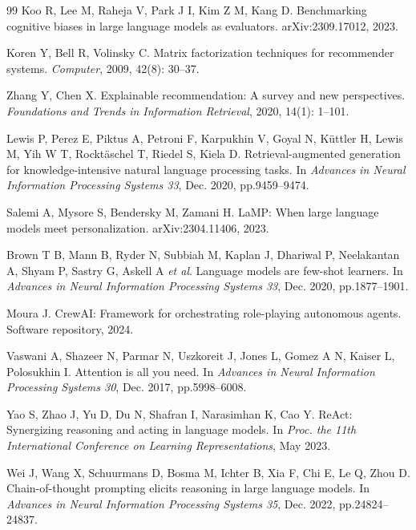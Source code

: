 \documentclass[9pt,twocolumn]{extarticle}
\begin{document}
\begin{thebibliography}{99}
Koo R, Lee M, Raheja V, Park J I, Kim Z M, Kang D. Benchmarking cognitive
biases in large language models as evaluators. arXiv:2309.17012, 2023.

Koren Y, Bell R, Volinsky C. Matrix factorization techniques for recommender
systems. \textit{Computer}, 2009, 42(8): 30--37.

Zhang Y, Chen X. Explainable recommendation: A survey and new perspectives.
\textit{Foundations and Trends in Information Retrieval}, 2020, 14(1): 1--101.

Lewis P, Perez E, Piktus A, Petroni F, Karpukhin V, Goyal N, K\"uttler H, Lewis
M, Yih W T, Rockt\"aschel T, Riedel S, Kiela D. Retrieval-augmented generation
for knowledge-intensive natural language processing tasks. In \textit{Advances
in Neural Information Processing Systems 33}, Dec. 2020, pp.9459--9474.

Salemi A, Mysore S, Bendersky M, Zamani H. LaMP: When large language models
meet personalization. arXiv:2304.11406, 2023.

Brown T B, Mann B, Ryder N, Subbiah M, Kaplan J, Dhariwal P, Neelakantan A,
Shyam P, Sastry G, Askell A \textit{et al}. Language models are few-shot
learners. In \textit{Advances in Neural Information Processing Systems 33},
Dec. 2020, pp.1877--1901.

Moura J. CrewAI: Framework for orchestrating role-playing autonomous agents.
Software repository, 2024.

Vaswani A, Shazeer N, Parmar N, Uszkoreit J, Jones L, Gomez A N, Kaiser L,
Polosukhin I. Attention is all you need. In \textit{Advances in Neural
Information Processing Systems 30}, Dec. 2017, pp.5998--6008.

Yao S, Zhao J, Yu D, Du N, Shafran I, Narasimhan K, Cao Y. ReAct: Synergizing
reasoning and acting in language models. In \textit{Proc. the 11th
International Conference on Learning Representations}, May 2023.

Wei J, Wang X, Schuurmans D, Bosma M, Ichter B, Xia F, Chi E, Le Q, Zhou D.
Chain-of-thought prompting elicits reasoning in large language models. In
\textit{Advances in Neural Information Processing Systems 35}, Dec. 2022,
pp.24824--24837.


\end{thebibliography}
\end{document}

